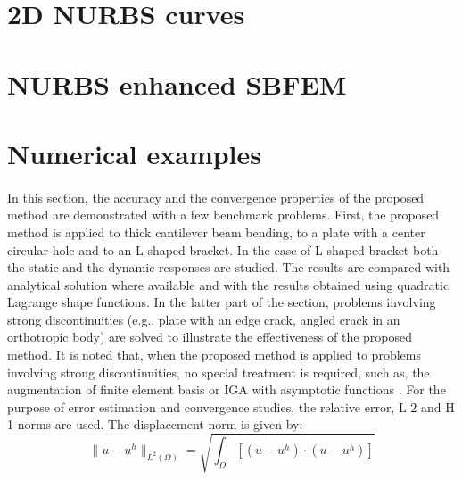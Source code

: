 \section{2D NURBS curves}

    



\section{NURBS enhanced SBFEM}








\section{Numerical examples}
\paragraph{}
In this section, the accuracy and the convergence properties of the proposed method are demonstrated with a few
    benchmark problems.
First, the proposed method is applied to thick cantilever beam bending, to a plate with a center
    circular hole and to an L-shaped bracket.
In the case of L-shaped bracket both the static and the dynamic responses are studied.
The results are compared with analytical solution where available and with the results obtained using quadratic
    Lagrange shape functions.
In the latter part of the section, problems involving strong discontinuities (e.g., plate with an edge crack,
    angled crack in an orthotropic body) are solved to illustrate the effectiveness of the proposed method.
It is noted that, when the proposed method is applied to problems involving strong discontinuities, no special 
    treatment is required, such as, the augmentation of finite element basis or IGA with asymptotic functions
    \cite{Benson2010} \cite{De2011}.
For the purpose of error estimation and convergence studies, the relative error, L 2 and H 1 norms are used.
The displacement norm is given by:
    \begin{equation}
        \| u - u^h \|_{L^2(\Omega)}=
        \sqrt{
            \int_{\Omega}\left[
                \left(
                    u-u^h
                \right) \cdot
                \left(
                    u-u^h
                \right)
            \right]
        }
    \end{equation}

